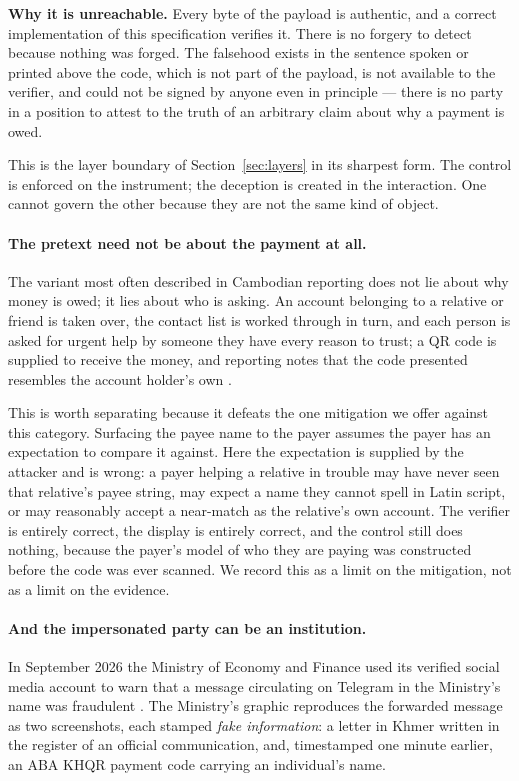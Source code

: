 \documentclass[10pt,a4paper,twocolumn]{article}
\begin{document}
\textbf{Why it is unreachable.} Every byte of the payload is authentic, and a
correct implementation of this specification verifies it. There is no forgery to
detect because nothing was forged. The falsehood exists in the sentence spoken
or printed above the code, which is not part of the payload, is not available to
the verifier, and could not be signed by anyone even in principle --- there is no
party in a position to attest to the truth of an arbitrary claim about why a
payment is owed.

This is the layer boundary of Section~\ref{sec:layers} in its sharpest form. The
control is enforced on the instrument; the deception is created in the
interaction. One cannot govern the other because they are not the same kind of
object.

\paragraph{The pretext need not be about the payment at all.}
The variant most often described in Cambodian reporting does not lie about why
money is owed; it lies about who is asking. An account belonging to a relative
or friend is taken over, the contact list is worked through in turn, and each
person is asked for urgent help by someone they have every reason to
trust; a QR code is supplied to receive the money, and reporting notes that the
code presented resembles the account holder's own \citep{kiripost2024scams}.

This is worth separating because it defeats the one mitigation we offer against
this category. Surfacing the payee name to the payer assumes the payer has an
expectation to compare it against. Here the expectation is supplied by the
attacker and is wrong: a payer helping a relative in trouble may have never seen
that relative's payee string, may expect a name they cannot spell in Latin
script, or may reasonably accept a near-match as the relative's own account. The
verifier is entirely correct, the display is entirely correct, and the control
still does nothing, because the payer's model of who they are paying was
constructed before the code was ever scanned. We record this as a limit on the
mitigation, not as a limit on the evidence.

\paragraph{And the impersonated party can be an institution.} In September 2026
the Ministry of Economy and Finance used its verified social media account to
warn that a message circulating on Telegram in the Ministry's name was
fraudulent \citep{mef2026telegram}. The Ministry's graphic reproduces the
forwarded message as two screenshots, each stamped \emph{fake information}: a
letter in Khmer written in the register of an official communication, and,
timestamped one minute earlier, an ABA KHQR payment code carrying an
individual's name.
\end{document}
